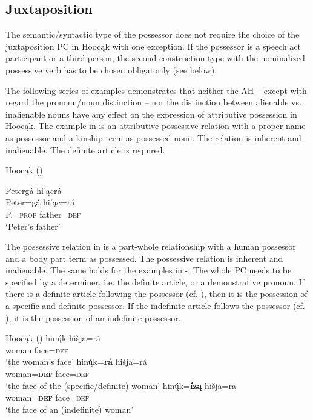 \documentclass[output=paper]{LSP/langsci}
\begin{document}
\subsection{Juxtaposition}\label{sec:helmbrecht:3.1}

The semantic/syntactic type of the possessor does not require the choice of the juxtaposition PC in Hoocąk with one exception. If the possessor is a speech act participant or a third person, the second construction type with the nominalized possessive verb has to be chosen obligatorily (see  below).

The following series of examples demonstrates that neither the AH – except with regard the pronoun/noun distinction – nor the distinction between alienable vs. inalienable nouns have any effect on the expression of attributive possession in Hoocąk. The example in  is an attributive possessive relation with a proper name as possessor and a kinship term as possessed noun. The relation is inherent and inalienable. The definite article is required.

\ea Hoocąk (\citealt[16]{Helmbrecht2003}) \label{petersfather}

\glll Petergá hi'\k{a}crá\\
Peter=gá       hi'\k{a}c=rá \\
  P.=\textsc{prop} father=\textsc{def} \\
\glt`Peter's father'
\z

The possessive relation in  is a part-whole relationship with a human possessor and a body part term as possessed. The possessive relation is inherent and inalienable. The same holds for the examples in -. The whole PC needs to be specified by a determiner, i.e. the definite article, or a demonstrative pronoun. If there is a definite article following the possessor (cf. ), then it is the possession of a specific and definite possessor. If the indefinite article follows the possessor (cf. ), it is the possession of an indefinite possessor. 

\ea Hoocąk (\citealt[13]{Helmbrecht2003})\label{womansface}
\ea \label{womansfacea}
\gll hinų́k    hišja=rá \\
woman face=\textsc{def} \\
\glt `the woman's face'
\ex\label{womansfaceb}
\gll hinų́́k=\textbf{rá}         hišja=rá \\
woman=\textbf{\textsc{def}} face=\textsc{def} \\
\trans `the face of the (specific/definite) woman'
\ex\label{womansfacec}
\gll hinų́́k=\textbf{íz\k{a}} hišja=ra \\
woman=\textbf{\textsc{def}}  face=\textsc{def} \\ 
\glt `the face of an (indefinite) woman'
\z
\z
\end{document}
